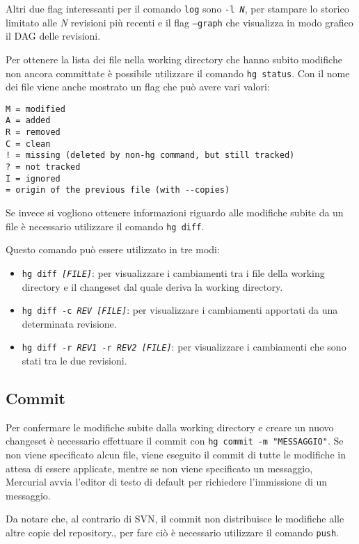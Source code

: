 Altri due flag interessanti per il comando \texttt{log} sono \texttt{-l \textit{N}}, per stampare lo storico limitato alle \textit{N} revisioni più recenti e il flag \texttt{--graph} che visualizza in modo grafico il DAG delle revisioni. 

Per ottenere la lista dei file nella working directory che hanno subito modifiche non ancora committate è possibile utilizzare il comando \texttt{hg status}. Con il nome dei file viene anche mostrato un flag che può avere vari valori:

\begin{verbatim}
M = modified
A = added
R = removed
C = clean
! = missing (deleted by non-hg command, but still tracked)
? = not tracked
I = ignored
= origin of the previous file (with --copies)
\end{verbatim}

Se invece si vogliono ottenere informazioni riguardo alle modifiche subite da un file è necessario utilizzare il comando \texttt{hg diff}.

Questo comando può essere utilizzato in tre modi:

\begin{itemize}
	\item \texttt{hg diff \textit{[FILE]}}: per visualizzare i cambiamenti tra i file della working directory e il changeset dal quale deriva la working directory.
	\item \texttt{hg diff -c \textit{REV} \textit{[FILE]}}: per visualizzare i cambiamenti apportati da una determinata revisione.
	\item \texttt{hg diff -r \textit{REV1} -r \textit{REV2} \textit{[FILE]}}: per visualizzare i cambiamenti che sono stati tra le due revisioni.
\end{itemize}

\subsection{Commit}

Per confermare le modifiche subite dalla working directory e creare un nuovo changeset è necessario effettuare il commit con \texttt{hg commit -m "MESSAGGIO"}. Se non viene specificato alcun file, viene eseguito il commit di tutte le modifiche in attesa di essere applicate, mentre se non viene specificato un messaggio, Mercurial avvia l'editor di testo di default per richiedere l'immissione di un messaggio.

Da notare che, al contrario di SVN, il commit non distribuisce le modifiche alle altre copie del repository., per fare ciò è necessario utilizzare il comando \texttt{push}.

